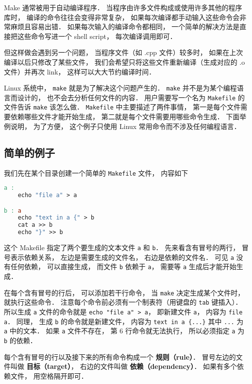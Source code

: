 
Make 通常被用于自动编译程序． 当程序由许多文件构成或使用许多其他的程序库时， 编译的命令往往会变得非常复杂， 如果每次编译都手动输入这些命令会非常麻烦且容易出错． 如果每次输入的编译命令都相同， 一个简单的解决方法是直接把这些命令写进一个 shell script， 每次编译调用即可．

但这样做会遇到另一个问题， 当程序文件（如 .cpp 文件）较多时， 如果在上次编译以后只修改了某些文件， 我们会希望只将这些文件重新编译（生成对应的 .o 文件）并再次 link， 这样可以大大节约编译时间．

Linux 系统中， \verb|make| 就是为了解决这个问题产生的． \verb|make| 并不是为某个编程语言而设计的， 也不会去分析任何文件的内容． 用户需要写一个名为 \verb|Makefile| 的文件告诉 \verb|make| 该怎么做． \verb|Makefile| 中主要描述了两件事情， 第一是每个文件需要依赖哪些文件才能开始生成， 第二就是每个文件需要用哪些命令生成． 下面举例说明， 为了方便， 这个例子只使用 Linux 常用命令而不涉及任何编程语言．


\subsection{简单的例子}
我们先在某个目录创建一个简单的 \verb|Makefile| 文件， 内容如下
\begin{lstlisting}[language=makefile]
a :
	echo "file a" > a

b : a
	echo "text in a {" > b
	cat a >> b
	echo "}" >> b
\end{lstlisting}
这个 Makefile 指定了两个要生成的文本文件 \verb|a| 和 \verb|b|． 先来看含有冒号的两行， 冒号表示依赖关系， 左边是需要生成的文件名， 右边是依赖的文件名． 可见 \verb|a| 没有任何依赖， 可以直接生成， 而文件 \verb|b| 依赖于 \verb|a|， 需要等 \verb|a| 生成后才能开始生成．

在每个含有冒号的行后， 可以添加若干行命令， 当 \verb|make| 决定生成某个文件时， 就执行这些命令． 注意每个命令前必须有一个制表符（用键盘的 \verb|tab| 键插入）． 所以生成 \verb|a| 文件的命令就是 \verb|echo "file a" > a|， 即新建文件 \verb|a|， 内容为 \verb|file a|． 同理， 生成 \verb|b| 的命令就是新建文件， 内容为 \verb|text in a {...}| 其中 \verb|...| 为 \verb|a| 中的文本． 如果 \verb|a| 文件不存在， 第 6 行命令就无法执行， 所以必须指定 \verb|a| 为 \verb|b| 的依赖．

每个含有冒号的行以及接下来的所有命令构成一个 \textbf{规则（rule）}． 冒号左边的文件叫做 \textbf{目标（target）}， 右边的文件叫做 \textbf{依赖（dependency）}． 如果有多个依赖文件， 用空格隔开即可．

